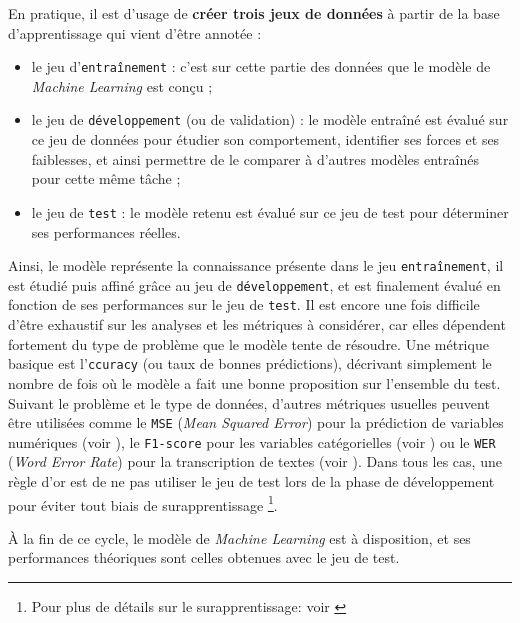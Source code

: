 			En pratique, il est d'usage de \textbf{créer trois jeux de données} à partir de la base d'apprentissage qui vient d'être annotée :
			\begin{itemize}
				\item le jeu d'\texttt{entraînement} :
				c'est sur cette partie des données que le modèle de \textit{Machine Learning} est conçu ;
				\item le jeu de \texttt{développement} (ou de validation) :
				le modèle entraîné est évalué sur ce jeu de données pour étudier son comportement, identifier ses forces et ses faiblesses, et ainsi permettre de le comparer à d'autres modèles entraînés pour cette même tâche ;
				\item le jeu de \texttt{test} :
				le modèle retenu est évalué sur ce jeu de test pour déterminer ses performances réelles.
			\end{itemize}
			
			Ainsi, le modèle représente la connaissance présente dans le jeu \texttt{entraînement}, il est étudié puis affiné grâce au jeu de \texttt{développement}, et est finalement évalué en fonction de ses performances sur le jeu de \texttt{test}.
			Il est encore une fois difficile d'être exhaustif sur les analyses et les métriques à considérer, car elles dépendent fortement du type de problème que le modèle tente de résoudre.
			Une métrique basique est l'\texttt{ccuracy} (ou taux de bonnes prédictions), décrivant simplement le nombre de fois où le modèle a fait une bonne proposition sur l'ensemble du test.
			Suivant le problème et le type de données, d'autres métriques usuelles peuvent être utilisées comme le \texttt{MSE} (\textit{Mean Squared Error}) pour la prédiction de variables numériques (voir \cite{wallach-goffinet:1987:mean-squared-error}), le \texttt{F1-score} pour les variables catégorielles (voir \cite{sasaki:2007:truth-fmeasure}) ou le \texttt{WER} (\textit{Word Error Rate}) pour la transcription de textes (voir \cite{mccowan-etal:2005:use-information-retrieval}).
			Dans tous les cas, une règle d'or est de ne pas utiliser le jeu de test lors de la phase de développement pour éviter tout biais de surapprentissage \footnote{
				Pour plus de détails sur le surapprentissage: voir \cite{collins:2017:chapter-overfitting}
			}.

			À la fin de ce cycle, le modèle de \textit{Machine Learning} est à disposition, et ses performances théoriques sont celles obtenues avec le jeu de test.
		

